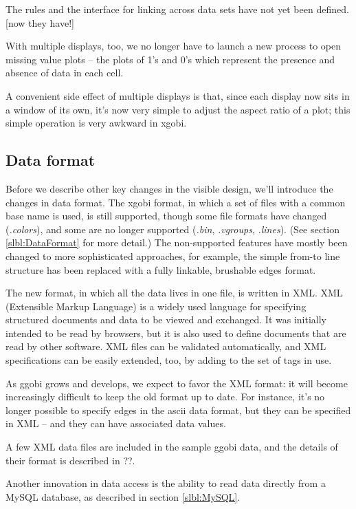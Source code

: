 \documentclass[11pt]{article}
\begin{document}
The rules and the interface for linking across data sets have not yet
been defined.  [now they have!]

With multiple displays, too, we no longer have to launch a new
process to open missing value plots -- the plots of 1's and 0's
which represent the presence and absence of data in each cell.

A convenient side effect of multiple displays is that, since each
display now sits in a window of its own, it's now very simple to
adjust the aspect ratio of a plot; this simple operation is very
awkward in xgobi.

\subsection {Data format}

Before we describe other key changes in the visible design, we'll
introduce the changes in data format.  The xgobi format, in which a
set of files with a common base name is used, is still supported,
though some file formats have changed ({\em .colors}), and some are no
longer supported ({\em .bin}, {\em .vgroups}, {\em .lines}).  (See
section \ref{slbl:DataFormat} for more detail.) The non-supported
features have mostly been changed to more sophisticated approaches,
for example, the simple from-to line structure has been replaced with
a fully linkable, brushable edges format.

The new format, in which all the data lives in one file, is written
in XML.  XML (Extensible Markup Language) is a widely used language
for specifying structured documents and data to be viewed and
exchanged.  It was initially intended to be read by browsers, but it
is also used to define documents that are read by other software.
XML files can be validated automatically, and XML specifications can
be easily extended, too, by adding to the set of tags in use.

As ggobi grows and develops, we expect to favor the XML format:  it
will become increasingly difficult to keep the old format up to
date.  For instance, it's no longer possible to specify edges
in the ascii data format, but they can be specified in XML -- and
they can have associated data values.

A few XML data files are included in the sample ggobi data, and
the details of their format is described in ??.

Another innovation in data access is the ability to read data
directly from a MySQL database, as described in section \ref{slbl:MySQL}.
\end{document}
